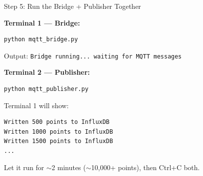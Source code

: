 \documentclass[aspectratio=169,11pt]{beamer}
\begin{document}
\begin{frame}[fragile]{Step 5: Run the Bridge + Publisher Together}

    \vspace{0.3cm}
    \textbf{Terminal 1 --- Bridge:}
\begin{lstlisting}[language=bash]
python mqtt_bridge.py
\end{lstlisting}
    {\small Output: \texttt{Bridge running... waiting for MQTT messages}}

    \vspace{0.2cm}
    \textbf{Terminal 2 --- Publisher:}
\begin{lstlisting}[language=bash]
python mqtt_publisher.py
\end{lstlisting}

    \vspace{0.2cm}
    Terminal 1 will show:
\begin{lstlisting}
Written 500 points to InfluxDB
Written 1000 points to InfluxDB
Written 1500 points to InfluxDB
...
\end{lstlisting}

    \vspace{0.1cm}
    {\small Let it run for $\sim$2 minutes ($\sim$10,000+ points), then Ctrl+C both.}

    \vspace{0.1cm}
\end{frame}
\end{document}
